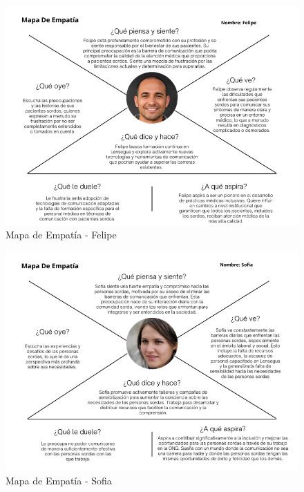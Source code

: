 \begin{figure} [H]
    \centering
    \includegraphics[width=0.9\linewidth]{figuras/mapa_empatia_felipe.png}
    \caption{Mapa de Empatía - Felipe}
    \label{fig:enter-label}
\end{figure}

\begin{figure} [H]
    \centering
    \includegraphics[width=0.9\linewidth]{figuras/mapa_empatia_sofia.png}
    \caption{Mapa de Empatía - Sofia}
    \label{fig:enter-label}
\end{figure}


